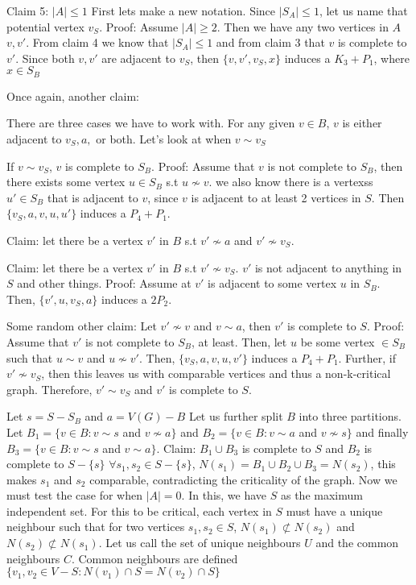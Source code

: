 \documentclass[12pt]{article}
\begin{document}

Claim 5: $|A| \leq 1$
First lets make a new notation. Since $|S_A| \leq 1$, let us name that potential vertex $v_S$.
Proof: Assume $|A| \geq 2$. Then we have any two vertices in $A$ $v, v'$. From claim 4 we know that $|S_A| \leq 1$ and from claim 3 that $v$ is complete to $v'$. Since both $v, v'$ are adjacent to $v_S$, then  $\{v, v', v_S, x \}$ induces a $K_3 + P_1$, where $x \in S_B$

Once again, another claim:

There are three cases we have to work with.
For any given  $v \in B$, $v$ is either adjacent to $v_S, a,$ or both. Let's look at when $v \sim v_S$

If $v \sim v_S$, $v$ is complete to $S_B$. Proof: Assume that $v$ is not complete to $S_B$, then there exists some vertex $u \in S_B$ s.t $u \not \sim v$. we also know there is a vertexss $u' \in S_B$ that is adjacent to $v$, since $v$ is adjacent to at least 2 vertices in $S$. Then $\{v_S, a, v, u, u'\}$ induces a $P_4 + P_1$.

Claim: let there be a vertex $v'$ in $B$ s.t $v' \not \sim a$ and $v' \not \sim v_S$.

Claim: let there be a vertex $v'$ in $B$ s.t $v' \not \sim v_S$. $v'$ is not adjacent to anything in $S$ and other things.
Proof: Assume at $v'$ is adjacent to some vertex $u$ in $S_B$. Then, $\{ v', u, v_S, a \}$ induces a $2P_2$.

Some random other claim: Let $v' \not \sim v$ and $v \sim a$, then $v'$ is complete to $S$.
Proof: Assume that $v'$ is not complete to $S_B$, at least. Then, let $u$ be some vertex $\in S_B$ such that $u \sim v$ and $u \not \sim v'$. Then, $\{v_S, a, v, u, v' \}$ induces a $P_4 + P_1$. Further, if $v' \not \sim v_S$, then this leaves us with comparable vertices and thus a non-k-critical graph. Therefore, $v' \sim v_S$ and $v'$ is complete to $S$.

Let $s = S - S_B$ and $a = V(G) - B$
Let us further split $B$ into three partitions. Let $B_1 = \{v \in B : v \sim s$ and $v \not \sim a \}$ and $B_2  =\{v \in B : v \sim a$ and $v \not \sim s \}$ and finally $B_3 = \{v \in B : v \sim s$ and $v \sim a \}$.
Claim: $B_1 \cup B_3$ is complete to $S$ and $B_2$ is complete to $S - \{s\}$
$\forall s_1, s_2 \in S - \{ s \}$, $N(s_1) = B_1 \cup B_2 \cup B_3 = N(s_2)$, this makes $s_1$ and $s_2$ comparable, contradicting the criticality of the graph.
%
Now we must test the case for when $|A| = 0$. In this, we have $S$ as the maximum independent set. For this to be critical, each vertex in $S$ must have a unique neighbour such that for two vertices $s_1, s_2 \in S$, $N(s_1) \not \subset N(s_2)$ and $N(s_2) \not \subset N(s_1)$.
Let us call the set of unique neighbours $U$ and the common neighbours $C$.
Common neighbours are defined $\{ v_1, v_2 \in V - S : N(v_1) \cap S = N(v_2) \cap S \}$
\end{document}
